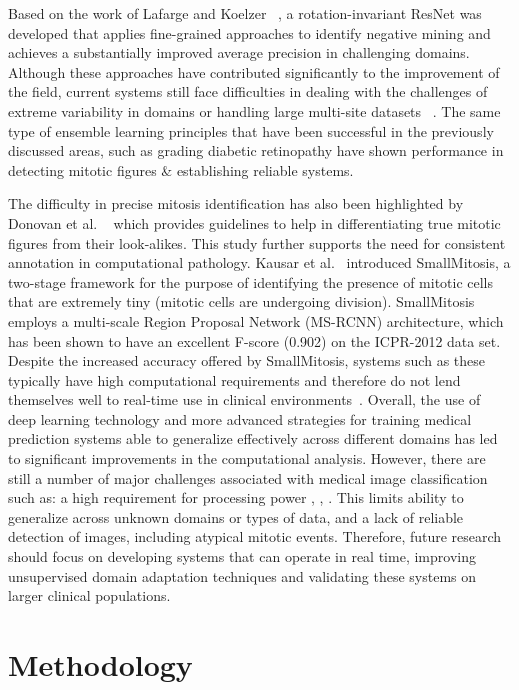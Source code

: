 \documentclass[conference]{IEEEtran}
\begin{document}
Based on the work of Lafarge and Koelzer ~\cite{Lafarge2022}, a rotation-invariant ResNet was developed that applies fine-grained approaches to identify negative mining and achieves a substantially improved average precision in challenging domains. Although these approaches have contributed significantly to the improvement of the field, current systems still face difficulties in dealing with the challenges of extreme variability in domains or handling large multi-site datasets ~\cite{Ammeling2022,Long2021}. The same type of ensemble learning principles that have been successful in the previously discussed areas, such as grading diabetic retinopathy \cite{Hou2022} have shown performance in detecting mitotic figures \& establishing reliable systems.

The difficulty in precise mitosis identification has also been highlighted by Donovan et al. ~\cite{Donovan2021} which provides guidelines to help in differentiating true mitotic figures from their look-alikes. This study further supports the need for consistent annotation in computational pathology. Kausar et al.~\cite{Kausar2020} introduced SmallMitosis, a two-stage framework for the purpose of identifying the presence of mitotic cells that are extremely tiny (mitotic cells are undergoing division). SmallMitosis employs a multi-scale Region Proposal Network (MS-RCNN) architecture, which has been shown to have an excellent F-score (0.902) on the ICPR-2012 data set. Despite the increased accuracy offered by SmallMitosis, systems such as these typically have high computational requirements and therefore do not lend themselves well to real-time use in clinical environments~\cite{Fick2024, Iqbal2022}. Overall, the use of deep learning technology and more advanced strategies for training medical prediction systems able to generalize effectively across different domains has led to significant improvements in the computational analysis. However, there are still a number of major challenges associated with medical image classification such as: a high requirement for processing power  \cite{anuj}, \cite{sruthi}, \cite{jaswanth}. This limits ability to generalize across unknown domains or types of data, and a lack of reliable detection of images, including atypical mitotic events. Therefore, future research should focus on developing systems that can operate in real time, improving unsupervised domain adaptation techniques and validating these systems on larger clinical populations.

\section{Methodology}
\end{document}
